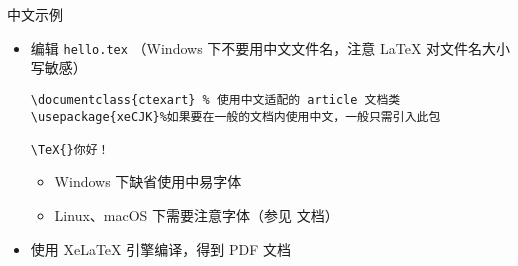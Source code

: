 \begin{frame}[fragile]{中文示例}
  \begin{itemize}
      \item 编辑 \texttt{hello.tex} （Windows 下不要用中文文件名，注意
      \LaTeX{} 对文件名大小写敏感）
      \begin{verbatim}
\documentclass{ctexart} % 使用中文适配的 article 文档类
\usepackage{xeCJK}%如果要在一般的文档内使用中文，一般只需引入此包

\TeX{}你好！

      \end{verbatim}
      \pause
      \begin{itemize}
        \item Windows 下缺省使用中易字体
        \item Linux、macOS 下需要注意字体（参见  文档）
      \end{itemize}
        \item 使用 Xe\LaTeX{} 引擎编译，得到 PDF 文档
      \begin{center}
      \end{center}
  \end{itemize}
\end{frame}
  

